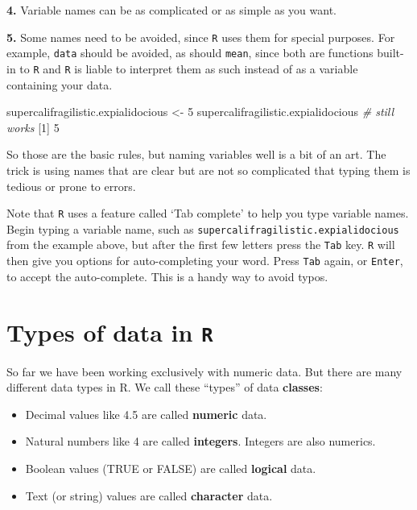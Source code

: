 \documentclass[
]{book}
\newenvironment{Shaded}{\begin{snugshade}}{\end{snugshade}}
\newcommand{\CommentTok}[1]{\textcolor[rgb]{0.56,0.35,0.01}{\textit{#1}}}
\newcommand{\DecValTok}[1]{\textcolor[rgb]{0.00,0.00,0.81}{#1}}
\newcommand{\NormalTok}[1]{#1}
\newcommand{\OtherTok}[1]{\textcolor[rgb]{0.56,0.35,0.01}{#1}}
\providecommand{\tightlist}{%
  \setlength{\itemsep}{0pt}\setlength{\parskip}{0pt}}
\begin{document}
\textbf{4.} Variable names can be as complicated or as simple as you want.

\textbf{5.} Some names need to be avoided, since \texttt{R} uses them for special purposes. For example, \texttt{data} should be avoided, as should \texttt{mean}, since both are functions built-in to \texttt{R} and \texttt{R} is liable to interpret them as such instead of as a variable containing your data.

\begin{Shaded}
\begin{Highlighting}[]
\NormalTok{supercalifragilistic.expialidocious }\OtherTok{\textless{}{-}} \DecValTok{5}
\NormalTok{supercalifragilistic.expialidocious  }\CommentTok{\# still works}
\NormalTok{[}\DecValTok{1}\NormalTok{] }\DecValTok{5}
\end{Highlighting}
\end{Shaded}

So those are the basic rules, but naming variables well is a bit of an art. The trick is using names that are clear but are not so complicated that typing them is tedious or prone to errors.

Note that \texttt{R} uses a feature called `Tab complete' to help you type variable names. Begin typing a variable name, such as \texttt{supercalifragilistic.expialidocious} from the example above, but after the first few letters press the \texttt{Tab} key. \texttt{R} will then give you options for auto-completing your word. Press \texttt{Tab} again, or \texttt{Enter}, to accept the auto-complete. This is a handy way to avoid typos.

\hypertarget{types-of-data-in-r}{%
\section*{\texorpdfstring{Types of data in \texttt{R}}{Types of data in R}}\label{types-of-data-in-r}}

So far we have been working exclusively with numeric data. But there are many different data types in R. We call these ``types'' of data \textbf{classes}:

\begin{itemize}
\tightlist
\item
  Decimal values like 4.5 are called \textbf{numeric} data.
\item
  Natural numbers like 4 are called \textbf{integers}. Integers are also numerics.
\item
  Boolean values (TRUE or FALSE) are called \textbf{logical} data.
\item
  Text (or string) values are called \textbf{character} data.
\end{itemize}
\end{document}
